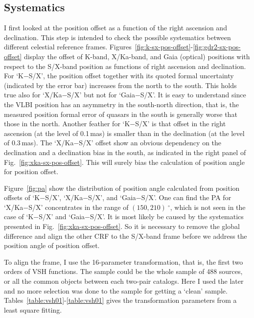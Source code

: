 \documentclass{aa}   %
\begin{document}
\subsection{Systematics}    \label{subsec:systematics}
I first looked at the position offset as a function of the right ascension and declination.
This step is intended to check the possible systematics between different celestial reference frames.
Figures~\ref{fig:k-sx-pos-offset}-\ref{fig:gdr2-sx-pos-offset} display the offset of K-band, X/Ka-band, and Gaia (optical) positions with respect to the S/X-band position as functions of right ascension and declination.
For `K$-$S/X', the position offset together with its quoted formal uncertainty (indicated by the error bar) increases from the north to the south.
This holds true also for `X/Ka$-$S/X' but not for `Gaia$-$S/X'.
It is easy to understand since the VLBI position has an asymmetry in the south-north direction, that is, the measured position formal error of quasars in the south is generally worse that those in the north.
Another feather for `K$-$S/X' is that offset in the right ascension (at the level of 0.1\,mas) is smaller than in the declination (at the level of 0.3\,mas). 
The `X/Ka$-$S/X' offset show an obvious dependency on the declination and a declination bias in the south, as indicated in the right panel of Fig.~\ref{fig:xka-sx-pos-offset}.
This will surely bias the calculation of position angle for position offset.

Figure~\ref{fig:pa} show the distribution of position angle calculated from position offsets of `K$-$S/X', `X/Ka$-$S/X', and `Gaia$-$S/X'.
One can find the PA for `X/Ka$-$S/X' concentrates in the range of $(150,210)~^\circ$, which is not seen in the case of `K$-$S/X' and `Gaia$-$S/X'.
It is most likely be caused by the systematics presented in Fig.~\ref{fig:xka-sx-pos-offset}.
So it is necessary to remove the global difference and align the other CRF to the S/X-band frame before we address the position angle of position offset.

To align the frame, I use the 16-parameter transformation, that is, the first two orders of VSH functions. 
The sample could be the whole sample of 488 sources, or all the common objects between each two-pair catalogs.
Here I used the later and no more selection was done to the sample for getting a `clean' sample.
Tables~\ref{table:vsh01}-\ref{table:vsh01} gives the transformation parameters from  a least square fitting.
\end{document}
